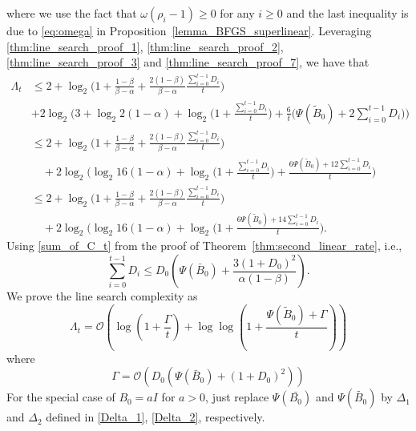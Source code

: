 \documentclass[11pt,letterpaper]{article}
\newcommand\0{{\Vector{0}}}
\newcommand\1{{\Vector{1}}}
\numberwithin{assumption}{section}
\numberwithin{definition}{section}
\numberwithin{theorem}{section}
\numberwithin{remark}{section}
\begin{document}
    where we use the fact that $\omega(\rho_i - 1) \geq 0$ for any $i \geq 0$ and the last inequality is due to \eqref{eq:omega} in Proposition~\ref{lemma_BFGS_superlinear}. Leveraging \eqref{thm:line_search_proof_1}, \eqref{thm:line_search_proof_2}, \eqref{thm:line_search_proof_3} and \eqref{thm:line_search_proof_7}, we have that
    \begin{equation*}
    \begin{split}
        \Lambda_t & \leq 2 + \log_{2}\Big(1 + \frac{1 - \beta}{\beta - \alpha} + \frac{2(1 - \beta)}{\beta - \alpha}\frac{\sum_{i = 0}^{t - 1}D_i}{t}\Big) \\
        & + 2\log_{2}\Big(3 +\log_{2}2(1 - \alpha) + \log_{2}\big(1 + \frac{\sum_{i = 0}^{t - 1}D_i}{t}) + \frac{6}{t}\big(\Psi(\tilde{B}_{0}) + 2\sum_{i = 0}^{t - 1}D_i\big)\Big) \\
        & \leq 2 + \log_{2}\Big(1 + \frac{1 - \beta}{\beta - \alpha} + \frac{2(1 - \beta)}{\beta - \alpha}\frac{\sum_{i = 0}^{t - 1}D_i}{t}\Big) \\
        & \quad + 2\log_{2}\Big(\log_{2}16(1 - \alpha) + \log_{2}\big(1 + \frac{\sum_{i = 0}^{t - 1}D_i}{t}) + \frac{6\Psi(\tilde{B}_{0}) + 12\sum_{i = 0}^{t - 1}D_i}{t}\Big) \\
        & \leq 2 + \log_{2}\Big(1 + \frac{1 - \beta}{\beta - \alpha} + \frac{2(1 - \beta)}{\beta - \alpha}\frac{\sum_{i = 0}^{t - 1}D_i}{t}\Big) \\
        & \quad + 2\log_{2}\Big(\log_{2}16(1 - \alpha) + \log_{2}\big(1 + \frac{6\Psi(\tilde{B}_{0}) + 14\sum_{i = 0}^{t - 1}D_i}{t}\Big).
    \end{split}
    \end{equation*}
    Using \eqref{sum_of_C_t} from the proof of Theorem~\ref{thm:second_linear_rate}, i.e.,
    \begin{equation*}
        \sum_{i = 0}^{t - 1}D_i \leq D_0\left(\Psi(\bar{B}_{0}) + \frac{3(1 + D_0)^2}{\alpha(1 - \beta)}\right).
    \end{equation*}
    We prove the line search complexity as
    \begin{equation*}
        \Lambda_t = \mathcal{O}\left(\log(1 + \frac{\Gamma}{t}) + \log\log(1 + \frac{\Psi(\tilde{B}_{0}) + \Gamma}{t})\right)
    \end{equation*}
    where
    \begin{equation*}
        \Gamma = \mathcal{O}\left(D_0(\Psi(\bar{B}_{0}) + (1 + D_0)^2)\right)
    \end{equation*}
    For the special case of $B_0 = a I$ for $a > 0$, just replace $\Psi(\bar{B_0})$ and $\Psi(\tilde{B_0})$ by $\Delta_1$ and $\Delta_2$ defined in \eqref{Delta_1}, \eqref{Delta_2}, respectively.
\end{document}
